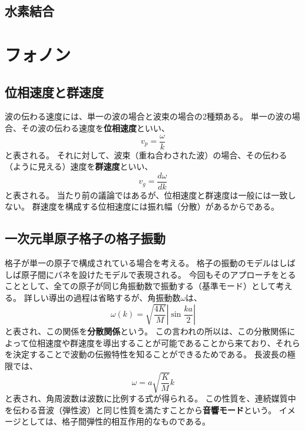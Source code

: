 \documentclass[a4paper]{jsreport}
\begin{document}
        \section{水素結合}

    \chapter{フォノン}
        \section{位相速度と群速度}
            波の伝わる速度には、単一の波の場合と波束の場合の2種類ある。
            単一の波の場合、その波の伝わる速度を\textbf{位相速度}といい、
            \begin{equation}
                v_p = \frac{\omega}{k}
            \end{equation}
            と表される。
            それに対して、波束（重ね合わされた波）の場合、その伝わる（ように見える）速度を\textbf{群速度}といい、
            \begin{equation}
                v_g = \frac{d\omega}{dk}
            \end{equation}
            と表される。
            当たり前の議論ではあるが、位相速度と群速度は一般には一致しない。
            群速度を構成する位相速度には振れ幅（分散）があるからである。

        \section{一次元単原子格子の格子振動}
            格子が単一の原子で構成されている場合を考える。
            格子の振動のモデルはしばしば原子間にバネを設けたモデルで表現される。
            今回もそのアプローチをとることとして、全ての原子が同じ角振動数で振動する（基準モード）として考える。
            詳しい導出の過程は省略するが、角振動数$\omega$は、
            \begin{equation}
                \omega(k) = \sqrt{\frac{4K}{M}} \left|\sin{\frac{ka}{2}} \right|
            \end{equation}
            と表され、この関係を\textbf{分散関係}という。
            この言われの所以は、この分散関係によって位相速度や群速度を導出することが可能であることから来ており、それらを決定することで波動の伝搬特性を知ることができるためである。
            長波長の極限では、
            \begin{equation}
                \omega = a \sqrt{\frac{K}{M}}k
            \end{equation}
            と表され、角周波数は波数に比例する式が得られる。
            この性質を、連続媒質中を伝わる音波（弾性波）と同じ性質を満たすことから\textbf{音響モード}という。
            イメージとしては、格子間弾性的相互作用的なものである。
\end{document}
